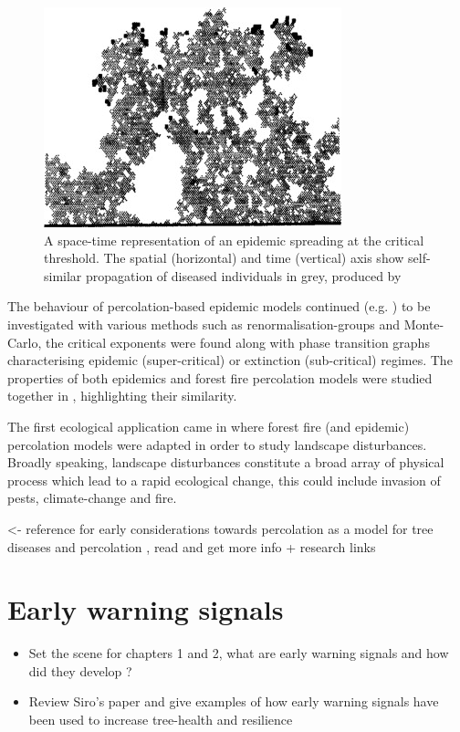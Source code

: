 \begin{figure}
    \centering
    \includegraphics{chapter2/figures/perc1.jpg}
    \caption{A space-time representation of an epidemic spreading at the critical threshold. The spatial (horizontal) and time (vertical) axis show self-similar propagation of diseased individuals in grey, produced by \cite{GRASSBERGER1986273}}
    \label{fig:1d_perc_basis}
\end{figure}

The behaviour of percolation-based epidemic models continued (e.g. \cite{pub.1060474189, pub.1059069981}) to be investigated with various methods such as renormalisation-groups and Monte-Carlo, the critical exponents were found along with phase transition graphs characterising epidemic (super-critical) or extinction (sub-critical) regimes. The properties of both epidemics and forest fire percolation models were studied together in \cite{pub.1052857560}, highlighting their similarity.

The first ecological application came in \cite{pub.1031591030} where forest fire (and epidemic) percolation models were adapted in order to study landscape disturbances. Broadly speaking, landscape disturbances constitute a broad array of physical process which lead to a rapid ecological change, this could include invasion of pests, climate-change and fire.

\textemdash \cite{GRASSBERGER1983157} <- reference for early considerations towards percolation as a model for tree diseases and percolation
\textemdash \cite{SANDER2002293}, read and get more info + research links

\section{Early warning signals}

\label{section:ews}
\begin{itemize}
    \item Set the scene for chapters 1 and 2, what are early warning signals and how did they develop ?
    \item Review Siro's paper and give examples of how early warning signals have been used to increase tree-health and resilience 
\end{itemize}


